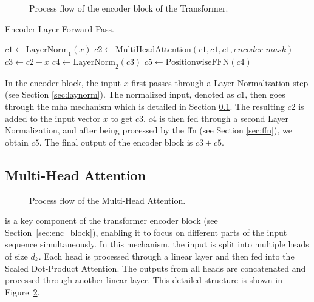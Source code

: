 \begin{figure}[t]
    \centering
    \begin{minipage}{\textwidth}
        
        \caption{Process flow of the encoder block of the Transformer.}
        \label{fig:encoder_block}
    \end{minipage}
    \vspace{-1em} %
\end{figure}

\begin{algorithm}[H]
\caption{Encoder Layer Forward Pass.}
\label{alg:encoder_layer}
$c1 \gets \text{LayerNorm}_1(x)$\;
$c2 \gets \text{MultiHeadAttention}(c1, c1, c1, encoder\_mask)$\;
$c3 \gets c2 + x$\;
$c4 \gets \text{LayerNorm}_2(c3)$\;
$c5 \gets \text{PositionwiseFFN}(c4)$\;
\end{algorithm}

\vspace{5mm}
In the encoder block, the input $x$ first passes through a Layer Normalization step (see Section \ref{sec:laynorm}). The normalized input, denoted as $c1$, then goes through the \gls{mha} mechanism which is detailed in Section \ref{sec:mha}. The resulting $c2$ is added to the input vector $x$ to get $c3$. $c4$ is then fed through a second Layer Normalization, and after being processed by the \gls{ffn} (see Section \ref{sec:ffn}), we obtain $c5$. The final output of the encoder block is $c3 + c5$.


\subsection{Multi-Head Attention}
\label{sec:mha}

\begin{figure}[t]
    \centering
    
    \caption{Process flow of the Multi-Head Attention.}
    \label{fig:multihead_attention}
\end{figure}
 is a key component of the transformer encoder block (see Section~\ref{sec:enc_block}), enabling it to focus on different parts of the input sequence simultaneously. In this mechanism, the input is split into multiple heads of size $d_k$. Each head is processed through a linear layer and then fed into the Scaled Dot-Product Attention. The outputs from all heads are concatenated and processed through another linear layer. This detailed structure is shown in Figure~\ref{fig:multihead_attention}.

